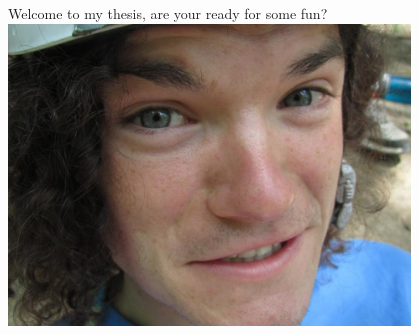 \begin{center}
	\Huge
	Welcome to my thesis, are your ready for some fun?
	\includegraphics[width=0.8\textwidth]{Images/seanFace.jpg}
	\normalsize
\end{center}
